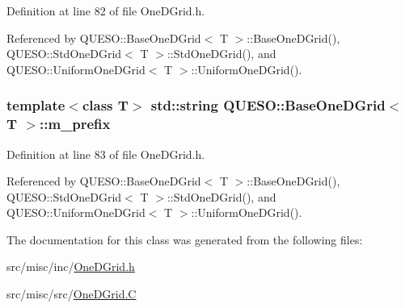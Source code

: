 Definition at line 82 of file One\-D\-Grid.\-h.



Referenced by Q\-U\-E\-S\-O\-::\-Base\-One\-D\-Grid$<$ T $>$\-::\-Base\-One\-D\-Grid(), Q\-U\-E\-S\-O\-::\-Std\-One\-D\-Grid$<$ T $>$\-::\-Std\-One\-D\-Grid(), and Q\-U\-E\-S\-O\-::\-Uniform\-One\-D\-Grid$<$ T $>$\-::\-Uniform\-One\-D\-Grid().

\hypertarget{class_q_u_e_s_o_1_1_base_one_d_grid_af5fa59e47fae9f6195b00e5bec8310f8}{
\subsubsection[{m\-\_\-prefix}]{\setlength{\rightskip}{0pt plus 5cm}template$<$class T$>$ std\-::string {\bf Q\-U\-E\-S\-O\-::\-Base\-One\-D\-Grid}$<$ T $>$\-::m\-\_\-prefix\hspace{0.3cm}{\ttfamily [protected]}}}\label{class_q_u_e_s_o_1_1_base_one_d_grid_af5fa59e47fae9f6195b00e5bec8310f8}


Definition at line 83 of file One\-D\-Grid.\-h.



Referenced by Q\-U\-E\-S\-O\-::\-Base\-One\-D\-Grid$<$ T $>$\-::\-Base\-One\-D\-Grid(), Q\-U\-E\-S\-O\-::\-Std\-One\-D\-Grid$<$ T $>$\-::\-Std\-One\-D\-Grid(), and Q\-U\-E\-S\-O\-::\-Uniform\-One\-D\-Grid$<$ T $>$\-::\-Uniform\-One\-D\-Grid().



The documentation for this class was generated from the following files\-:\begin{DoxyCompactItemize}
\item 
src/misc/inc/\hyperlink{_one_d_grid_8h}{One\-D\-Grid.\-h}\item 
src/misc/src/\hyperlink{_one_d_grid_8_c}{One\-D\-Grid.\-C}\end{DoxyCompactItemize}
